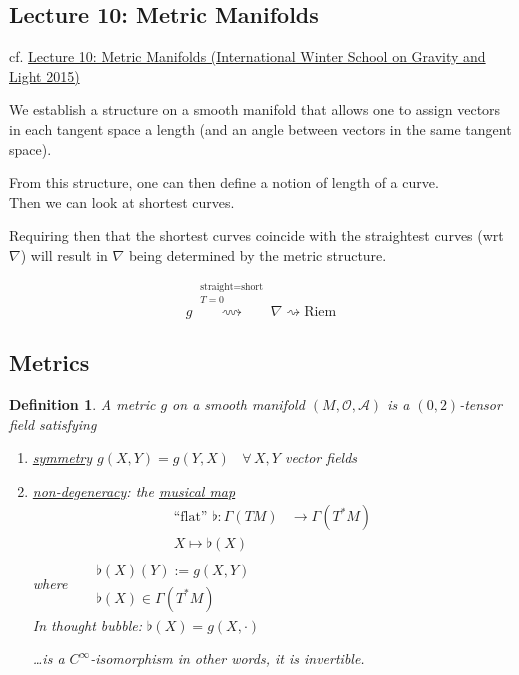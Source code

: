 \documentclass[10pt, twoside]{amsart}
\newtheorem{definition}{Definition}
\begin{document}
\begin{multicols*}{2}
\section{Lecture 10: Metric Manifolds}

cf. \href{https://youtu.be/ONCZNwKswn4}{Lecture 10: Metric Manifolds (International Winter School on Gravity and Light 2015)}

We establish a structure on a smooth manifold that allows one to assign vectors in each tangent space a length (and an angle between vectors in the same tangent space).

From this structure, one can then define a notion of length of a curve. \\
Then we can look at shortest curves.

Requiring then that the shortest curves coincide with the straightest curves (wrt $\nabla$) will result in $\nabla$ being determined by the metric structure.  

\[
g  \overset{ \substack{ \text{straight} = \text{short} \\ T =0 }  }{ \rightsquigarrow }  \nabla \rightsquigarrow \text{Riem}
\]


\subsection{Metrics}

\begin{definition}
  A metric $g$ on a smooth manifold $(M,\mathcal{O}, \mathcal{A})$ is a $(0,2)$-tensor field satisfying
\begin{enumerate}
  \item[(i)] \underline{symmetry} $g(X,Y) = g(Y,X)$ \, $\forall \, X, Y$ vector fields
\item[(ii)] \underline{non-degeneracy}: the \underline{musical map} 
\[
\begin{aligned}
  \text{``flat''} \, \,  \flat : \Gamma(TM) & \to \Gamma(T^*M) \\ 
  X \mapsto \flat(X)
\end{aligned}
\]
\emph{where} \quad \,  $\begin{aligned} & \quad \quad \\ 
  & \flat(X)(Y):= g(X,Y) \\
  & \flat(X) \in \Gamma(T^*M) \end{aligned}$ \\
In thought bubble: $\flat(X) = g(X,\cdot)$

\dots is a $C^{\infty}$-isomorphism in other words, it is invertible.  



\end{enumerate}
\end{definition}
\end{multicols*}
\end{document}
